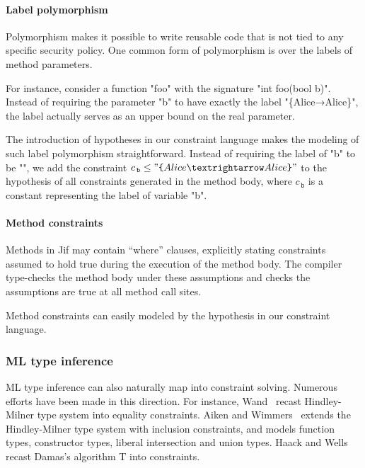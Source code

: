 \paragraph{Label polymorphism}

Polymorphism makes it possible to write reusable code that is not tied
to any specific security policy. One common form of polymorphism is
over the labels of method parameters. 

For instance, consider a function "foo"
with the signature "int foo(bool b)".
Instead of requiring the parameter "b" to have exactly the label
"\{Alice→Alice\}", the label actually serves as an upper bound on the
real parameter.

The introduction of hypotheses in our constraint language makes the
modeling of such label polymorphism straightforward. Instead of
requiring the label of "b" to
be "", we add the constraint $c_{\,\texttt{b}} \leq
"\lab{Alice→Alice}"$ to the hypothesis of all constraints generated in the
method body, where $c_{\,\texttt{b}}$ is a constant representing the label of
variable "b".

\paragraph{Method constraints}

Methods in Jif may contain ``where'' clauses, explicitly stating
constraints assumed to hold true during the execution of the method
body. The compiler type-checks the method body under these assumptions
and checks the assumptions are true at all method call sites. 

Method constraints can easily modeled by the hypothesis in our
constraint language.
 
\subsubsection{ML type inference}

ML type inference can also naturally map into constraint solving. Numerous 
efforts have been made in this direction. For instance,
Wand~\cite{wand-typeinference} recast Hindley-Milner type system into equality
constraints. Aiken and Wimmers~\cite{aiken-typeinclusion} extends the
Hindley-Milner type system with inclusion constraints, and models function
types, constructor types, liberal intersection and union types. Haack and Wells
~\cite{haack:slicing} recast Damas’s algorithm T into constraints.

